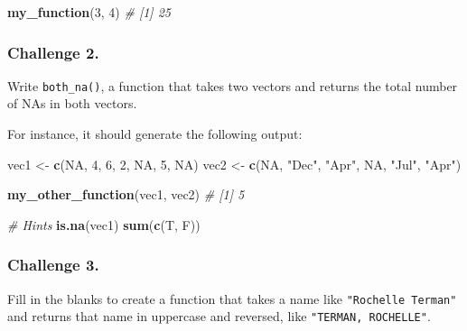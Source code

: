 \documentclass[]{book}
\newenvironment{Shaded}{\begin{snugshade}}{\end{snugshade}}
\newcommand{\KeywordTok}[1]{\textcolor[rgb]{0.13,0.29,0.53}{\textbf{#1}}}
\newcommand{\DecValTok}[1]{\textcolor[rgb]{0.00,0.00,0.81}{#1}}
\newcommand{\StringTok}[1]{\textcolor[rgb]{0.31,0.60,0.02}{#1}}
\newcommand{\CommentTok}[1]{\textcolor[rgb]{0.56,0.35,0.01}{\textit{#1}}}
\newcommand{\OtherTok}[1]{\textcolor[rgb]{0.56,0.35,0.01}{#1}}
\newcommand{\NormalTok}[1]{#1}
\begin{document}
\begin{Shaded}
\begin{Highlighting}[]
\KeywordTok{my_function}\NormalTok{(}\DecValTok{3}\NormalTok{, }\DecValTok{4}\NormalTok{)}
\CommentTok{# [1] 25}
\end{Highlighting}
\end{Shaded}

\subsubsection*{Challenge 2.}\label{challenge-2.-12}

Write \texttt{both\_na()}, a function that takes two vectors and returns
the total number of NAs in both vectors.

For instance, it should generate the following output:

\begin{Shaded}
\begin{Highlighting}[]
\NormalTok{vec1 <-}\StringTok{ }\KeywordTok{c}\NormalTok{(}\OtherTok{NA}\NormalTok{, }\DecValTok{4}\NormalTok{, }\DecValTok{6}\NormalTok{, }\DecValTok{2}\NormalTok{, }\OtherTok{NA}\NormalTok{, }\DecValTok{5}\NormalTok{, }\OtherTok{NA}\NormalTok{)}
\NormalTok{vec2 <-}\StringTok{ }\KeywordTok{c}\NormalTok{(}\OtherTok{NA}\NormalTok{, }\StringTok{"Dec"}\NormalTok{, }\StringTok{"Apr"}\NormalTok{, }\OtherTok{NA}\NormalTok{, }\StringTok{"Jul"}\NormalTok{, }\StringTok{"Apr"}\NormalTok{)}

\KeywordTok{my_other_function}\NormalTok{(vec1, vec2)}
\CommentTok{# [1] 5}

\CommentTok{# Hints}
\KeywordTok{is.na}\NormalTok{(vec1)}
\KeywordTok{sum}\NormalTok{(}\KeywordTok{c}\NormalTok{(T, F))}
\end{Highlighting}
\end{Shaded}

\subsubsection*{Challenge 3.}\label{challenge-3.-9}

Fill in the blanks to create a function that takes a name like
\texttt{"Rochelle\ Terman"} and returns that name in uppercase and
reversed, like \texttt{"TERMAN,\ ROCHELLE"}.
\end{document}
